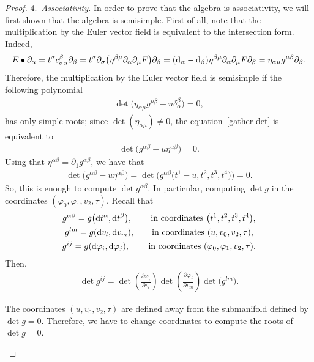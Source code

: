 \documentclass[10pt,a4paper]{amsart}
\numberwithin{equation}{section}
\begin{document}
\begin{proof}
4.\ \textit{Associativity.}
In order to prove that the algebra is associativity, we will first shown that the algebra is semisimple. First of all, note that the multiplication by the Euler vector field is equivalent to the intersection form. Indeed,
\begin{gather}
\label{relation multiplication Euler and intersection form}
E\bullet\partial_{\alpha}=t^{\sigma}c_{\sigma\alpha}^{\beta}\partial_{\beta} =t^{\sigma}\partial_{\sigma}\big(\eta^{\beta\mu}\partial_{\alpha}\partial_{\mu}F \big) \partial_{\beta}
=({\rm d}_{\alpha}-{\rm d}_{\beta})\eta^{\beta\mu}\partial_{\alpha}\partial_{\mu}F \partial_{\beta}=\eta_{\alpha\mu}g^{\mu\beta} \partial_{\beta}.
\end{gather}
Therefore, the multiplication by the Euler vector field is semisimple if the following polynomial
\begin{gather}\label{gather det}
\det\big(\eta_{\alpha\mu}g^{\mu\beta}-u\delta_{\alpha}^{\beta}\big)=0,
\end{gather}
has only simple roots; since $\det(\eta_{\alpha\mu})\neq 0$, the equation~\eqref{gather det} is equivalent to
\begin{gather*}
\det\big(g^{\alpha\beta}-u\eta^{\alpha\beta}\big)=0.
\end{gather*}
Using that $\eta^{\alpha\beta}=\partial_1g^{\alpha\beta}$, we have that
\begin{gather*}
\det\big(g^{\alpha\beta}-u\eta^{\alpha\beta}\big)=\det \big(g^{\alpha\beta}\big(t^1-u,t^2,t^3,t^4\big)\big)=0.
\end{gather*}
So, this is enough to compute $\det g^{\alpha\beta}$. In particular, computing $\det g$ in the coordinates $(\varphi_0,\varphi_1,v_2, \tau)$. Recall that
\begin{gather*}
g^{\alpha\beta}=g\big({\rm d}t^{\alpha},{\rm d}t^{\beta}\big),\qquad\, \text{in coordinates } \big(t^1,t^2,t^3,t^4\big),
\\
g^{lm}=g({{\rm d}v_l,{\rm d}v_m}), \qquad \text{in coordinates } (u,v_0,v_2,\tau),
\\
g^{ij}=g({{\rm d}\varphi_i,{\rm d}\varphi_j}), \qquad\, \text{in coordinates } (\varphi_0,\varphi_1,v_2,\tau).
\end{gather*}
Then,
\begin{gather*}
\det g^{ij}= \det\left(\frac{\partial\varphi_i}{\partial v_l} \right) \det\left(\frac{\partial\varphi_j}{\partial v_m} \right)\det \big(g^{lm}\big).
\end{gather*}

\begin{Remark}The coordinates $(u,v_0,v_2,\tau)$ are defined away from the submanifold defined by $\det g=0$. Therefore, we have to change coordinates to compute the roots of $\det g=0$.
\end{Remark}


\end{proof}
\end{document}

